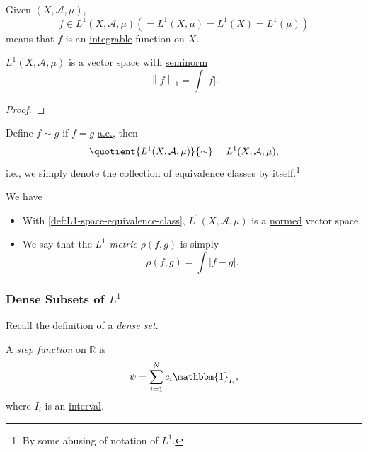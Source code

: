 \begin{definition}[\(L^1\) Space]\label{def:L1-space}
	Given \((X, \mathcal{A} , \mu )\),
	\[
		f\in L^1(X, \mathcal{A} , \mu )\left( = L^1(X, \mu ) = L^1(X) = L^1(\mu )\right)
	\]
	means that \(f\) is an \hyperref[def:integrable]{integrable} function on \(X\).
\end{definition}

\begin{lemma}
	\(L^1(X, \mathcal{A} , \mu )\) is a vector space with \hyperref[def:seminorm]{seminorm}
	\[
		\left\lVert f\right\rVert _1 = \int \left\vert f \right\vert .
	\]
\end{lemma}
\begin{proof}
\end{proof}

\begin{definition}\label{def:L1-space-equivalence-class}
	Define \(f\sim g\) if \(f = g\) \hyperref[def:mu-almost-everywhere]{a.e.}, then
	\[
		\quotient{L^1(X, \mathcal{A} , \mu )}{\sim} = L^1(X, \mathcal{A} , \mu ),
	\]
	i.e., we simply denote the collection of equivalence classes by itself.\footnote{By some abusing of notation of \(L^1\).}
\end{definition}
\begin{remark}
	We have
	\begin{itemize}
		\item With \autoref{def:L1-space-equivalence-class}, \(L^1(X, \mathcal{A} , \mu )\) is a \hyperref[def:norm]{normed} vector space.
		\item \label{def:L-1-metric} We say that the \emph{\(L^1\)-metric} \(\rho (f, g)\) is simply
		      \[
			      \rho (f, g) = \int \left\vert f - g \right\vert.
		      \]
	\end{itemize}
\end{remark}

\subsubsection{Dense Subsets of \(L^1\)}
\begin{note}
	Recall the definition of a \href{https://en.wikipedia.org/wiki/Dense_set}{\emph{dense set}}.
\end{note}

\begin{definition}\label{def:step-function}
	A \emph{step function} on \(\mathbb{R} \) is
	\[
		\psi = \sum_{i=1}^{N} c_{i}\mathbbm{1}_{I_{i}},
	\]
	where \(I_{i}\) is an \underline{interval}.
\end{definition}

